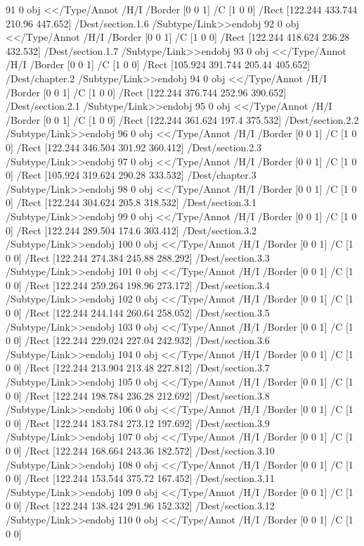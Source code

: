 {{{{{{{{{{{{{{{{{{{{{{{{{{{{91 0 obj
<</Type/Annot
/H/I
/Border [0 0 1]
/C [1 0 0]
/Rect [122.244 433.744 210.96 447.652]
/Dest/section.1.6
/Subtype/Link>>endobj
92 0 obj
<</Type/Annot
/H/I
/Border [0 0 1]
/C [1 0 0]
/Rect [122.244 418.624 236.28 432.532]
/Dest/section.1.7
/Subtype/Link>>endobj
93 0 obj
<</Type/Annot
/H/I
/Border [0 0 1]
/C [1 0 0]
/Rect [105.924 391.744 205.44 405.652]
/Dest/chapter.2
/Subtype/Link>>endobj
94 0 obj
<</Type/Annot
/H/I
/Border [0 0 1]
/C [1 0 0]
/Rect [122.244 376.744 252.96 390.652]
/Dest/section.2.1
/Subtype/Link>>endobj
95 0 obj
<</Type/Annot
/H/I
/Border [0 0 1]
/C [1 0 0]
/Rect [122.244 361.624 197.4 375.532]
/Dest/section.2.2
/Subtype/Link>>endobj
96 0 obj
<</Type/Annot
/H/I
/Border [0 0 1]
/C [1 0 0]
/Rect [122.244 346.504 301.92 360.412]
/Dest/section.2.3
/Subtype/Link>>endobj
97 0 obj
<</Type/Annot
/H/I
/Border [0 0 1]
/C [1 0 0]
/Rect [105.924 319.624 290.28 333.532]
/Dest/chapter.3
/Subtype/Link>>endobj
98 0 obj
<</Type/Annot
/H/I
/Border [0 0 1]
/C [1 0 0]
/Rect [122.244 304.624 205.8 318.532]
/Dest/section.3.1
/Subtype/Link>>endobj
99 0 obj
<</Type/Annot
/H/I
/Border [0 0 1]
/C [1 0 0]
/Rect [122.244 289.504 174.6 303.412]
/Dest/section.3.2
/Subtype/Link>>endobj
100 0 obj
<</Type/Annot
/H/I
/Border [0 0 1]
/C [1 0 0]
/Rect [122.244 274.384 245.88 288.292]
/Dest/section.3.3
/Subtype/Link>>endobj
101 0 obj
<</Type/Annot
/H/I
/Border [0 0 1]
/C [1 0 0]
/Rect [122.244 259.264 198.96 273.172]
/Dest/section.3.4
/Subtype/Link>>endobj
102 0 obj
<</Type/Annot
/H/I
/Border [0 0 1]
/C [1 0 0]
/Rect [122.244 244.144 260.64 258.052]
/Dest/section.3.5
/Subtype/Link>>endobj
103 0 obj
<</Type/Annot
/H/I
/Border [0 0 1]
/C [1 0 0]
/Rect [122.244 229.024 227.04 242.932]
/Dest/section.3.6
/Subtype/Link>>endobj
104 0 obj
<</Type/Annot
/H/I
/Border [0 0 1]
/C [1 0 0]
/Rect [122.244 213.904 213.48 227.812]
/Dest/section.3.7
/Subtype/Link>>endobj
105 0 obj
<</Type/Annot
/H/I
/Border [0 0 1]
/C [1 0 0]
/Rect [122.244 198.784 236.28 212.692]
/Dest/section.3.8
/Subtype/Link>>endobj
106 0 obj
<</Type/Annot
/H/I
/Border [0 0 1]
/C [1 0 0]
/Rect [122.244 183.784 273.12 197.692]
/Dest/section.3.9
/Subtype/Link>>endobj
107 0 obj
<</Type/Annot
/H/I
/Border [0 0 1]
/C [1 0 0]
/Rect [122.244 168.664 243.36 182.572]
/Dest/section.3.10
/Subtype/Link>>endobj
108 0 obj
<</Type/Annot
/H/I
/Border [0 0 1]
/C [1 0 0]
/Rect [122.244 153.544 375.72 167.452]
/Dest/section.3.11
/Subtype/Link>>endobj
109 0 obj
<</Type/Annot
/H/I
/Border [0 0 1]
/C [1 0 0]
/Rect [122.244 138.424 291.96 152.332]
/Dest/section.3.12
/Subtype/Link>>endobj
110 0 obj
<</Type/Annot
/H/I
/Border [0 0 1]
/C [1 0 0]
}}}}}}}}}}}}}}}}}}}}}}}}}}}}
